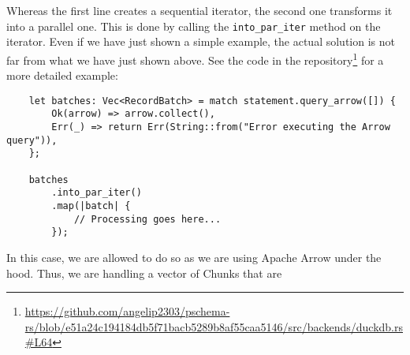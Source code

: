 Whereas the first line creates a sequential iterator, the second one transforms it into a parallel one. This is done by calling the \texttt{into\_par\_iter} method on the iterator. Even if we have just shown a simple example, the actual solution is not far from what we have just shown above. See the code in the repository\footnote{\url{https://github.com/angelip2303/pschema-rs/blob/e51a24c194184db5f71bacb5289b8af55caa5146/src/backends/duckdb.rs\#L64}} for a more detailed example:

\begin{verbatim}
    let batches: Vec<RecordBatch> = match statement.query_arrow([]) {
        Ok(arrow) => arrow.collect(),
        Err(_) => return Err(String::from("Error executing the Arrow query")),
    };

    batches
        .into_par_iter()
        .map(|batch| {
            // Processing goes here...
        });
\end{verbatim}

In this case, we are allowed to do so as we are using Apache Arrow under the hood. Thus, we are handling a vector of Chunks that are